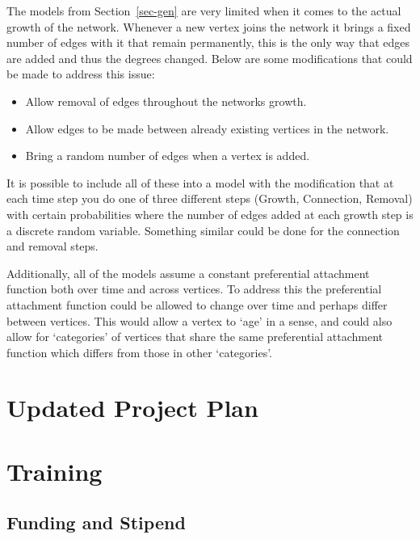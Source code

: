 \documentclass[
  10pt,
  a4paper,
]{scrreprt}
\providecommand{\tightlist}{%
  \setlength{\itemsep}{0pt}\setlength{\parskip}{0pt}}\usepackage{longtable,booktabs,array}
\theoremstyle{definition}
\theoremstyle{plain}
\theoremstyle{plain}
\theoremstyle{plain}
\theoremstyle{remark}
\begin{document}
{The models from Section~\ref{sec-gen} are very limited when it comes to
the actual growth of the network. Whenever a new vertex joins the
network it brings a fixed number of edges with it that remain
permanently, this is the only way that edges are added and thus the
degrees changed. Below are some modifications that could be made to
address this issue:

\begin{itemize}
\tightlist
\item
  Allow removal of edges throughout the networks growth.
\item
  Allow edges to be made between already existing vertices in the
  network.
\item
  Bring a random number of edges when a vertex is added.
\end{itemize}

It is possible to include all of these into a model with the
modification that at each time step you do one of three different steps
(Growth, Connection, Removal) with certain probabilities where the
number of edges added at each growth step is a discrete random variable.
Something similar could be done for the connection and removal steps.

Additionally, all of the models assume a constant preferential
attachment function both over time and across vertices. To address this
the preferential attachment function could be allowed to change over
time and perhaps differ between vertices. This would allow a vertex to
`age' in a sense, and could also allow for `categories' of vertices that
share the same preferential attachment function which differs from those
in other `categories'.

\appendix

\hypertarget{sec-plan}{%
\chapter{Updated Project Plan}\label{sec-plan}}

\hypertarget{training}{%
\chapter{Training}\label{training}}

\hypertarget{funding-and-stipend}{%
\section*{Funding and Stipend}\label{funding-and-stipend}}

}
\end{document}
